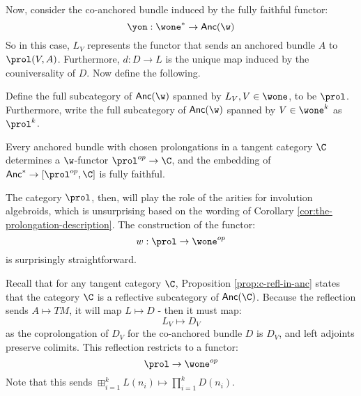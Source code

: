 Now, consider the co-anchored bundle induced by the fully faithful functor:
\[
	\yon: \wone^* \to \mathsf{Anc}(\w)
\]
So in this case, $L_V$ represents the functor that sends an anchored bundle $A$ to $\prol(V,A)$. Furthermore, $d:D \to L$ is the unique map induced by the couniversality of $D$. Now define the following.
\begin{definition}%
	\label{def:prol-cat}
	Define the full subcategory of $\mathsf{Anc}(\w)$ spanned by $L_V, V \in \wone$, to be $\prol$. Furthermore, write the full subcategory of $\mathsf{Anc}(\w)$ spanned by $V \in \wone^k$ as $\prol^k$.
\end{definition}
\begin{proposition}%
	\label{prop:nerve-thm-for-coprol}
	Every anchored bundle with chosen prolongations in a tangent category $\C$ determines a $\w$-functor $\prol^{op} \to \C$, and the embedding of $\mathsf{Anc}^* \to [\prol^{op}, \C]$ is fully faithful.
\end{proposition}

The category $\prol$, then, will play the role of the arities for involution algebroids, which is unsurprising based on the wording of Corollary \ref{cor:the-prolongation-description}. The construction of the functor:
\[
	w: \prol \to \wone^{op}
\]
is surprisingly straightforward.
\begin{observation}
	Recall that for any tangent category $\C$, Proposition \ref{prop:c-refl-in-anc} states that the category $\C$ is a reflective subcategory of $\mathsf{Anc}(\C)$. Because the reflection sends $A \mapsto TM$, it will map $L \mapsto D$ - then it must map:
	\[
		L_V \mapsto D_V
	\] as the coprolongation of $D_V$ for the co-anchored bundle $D$ is $D_V$, and left adjoints preserve colimits. This reflection restricts to a functor:
	\[
		\prol \to \wone^{op}
	\]
	Note that this sends $\boxplus^k_{i=1} L(n_i) \mapsto \prod^k_{i=1}D(n_i)$.
\end{observation}

